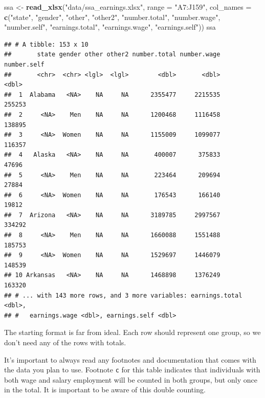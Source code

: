 \documentclass[]{book}
\newenvironment{Shaded}{\begin{snugshade}}{\end{snugshade}}
\newcommand{\KeywordTok}[1]{\textcolor[rgb]{0.13,0.29,0.53}{\textbf{{#1}}}}
\newcommand{\DataTypeTok}[1]{\textcolor[rgb]{0.13,0.29,0.53}{{#1}}}
\newcommand{\StringTok}[1]{\textcolor[rgb]{0.31,0.60,0.02}{{#1}}}
\newcommand{\NormalTok}[1]{{#1}}
\theoremstyle{definition}
\theoremstyle{definition}
\theoremstyle{remark}
\begin{document}
\begin{Shaded}
\begin{Highlighting}[]
\NormalTok{ssa <-}\StringTok{ }\KeywordTok{read_xlsx}\NormalTok{(}\StringTok{"data/ssa_earnings.xlsx"}\NormalTok{, }\DataTypeTok{range =} \StringTok{"A7:J159"}\NormalTok{, }
                 \DataTypeTok{col_names =} \KeywordTok{c}\NormalTok{(}\StringTok{"state"}\NormalTok{, }\StringTok{"gender"}\NormalTok{, }\StringTok{"other"}\NormalTok{, }\StringTok{"other2"}\NormalTok{, }\StringTok{"number.total"}\NormalTok{, }\StringTok{"number.wage"}\NormalTok{, }\StringTok{"number.self"}\NormalTok{, }
                               \StringTok{"earnings.total"}\NormalTok{, }\StringTok{"earnings.wage"}\NormalTok{, }\StringTok{"earnings.self"}\NormalTok{))}
\NormalTok{ssa}
\end{Highlighting}
\end{Shaded}

\begin{verbatim}
## # A tibble: 153 x 10
##       state gender other other2 number.total number.wage number.self
##       <chr>  <chr> <lgl>  <lgl>        <dbl>       <dbl>       <dbl>
##  1  Alabama   <NA>    NA     NA      2355477     2215535      255253
##  2     <NA>    Men    NA     NA      1200468     1116458      138895
##  3     <NA>  Women    NA     NA      1155009     1099077      116357
##  4   Alaska   <NA>    NA     NA       400007      375833       47696
##  5     <NA>    Men    NA     NA       223464      209694       27884
##  6     <NA>  Women    NA     NA       176543      166140       19812
##  7  Arizona   <NA>    NA     NA      3189785     2997567      334292
##  8     <NA>    Men    NA     NA      1660088     1551488      185753
##  9     <NA>  Women    NA     NA      1529697     1446079      148539
## 10 Arkansas   <NA>    NA     NA      1468898     1376249      163320
## # ... with 143 more rows, and 3 more variables: earnings.total <dbl>,
## #   earnings.wage <dbl>, earnings.self <dbl>
\end{verbatim}

The starting format is far from ideal. Each row should represent one
group, so we don't need any of the rows with totals.

It's important to always read any footnotes and documentation that comes
with the data you plan to use. Footnote \texttt{c} for this table
indicates that individuals with both wage and salary employment will be
counted in both groups, but only once in the total. It is important to
be aware of this double counting.
\end{document}
